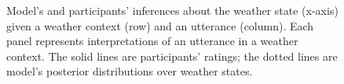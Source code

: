 \documentclass[10pt,letterpaper]{article}
\begin{document}
\begin{figure}[t]
\caption{Model's and participants' inferences about the weather state (x-axis) given a weather context (row) and an utterance (column). Each panel represents interpretations of an utterance in a weather context. The solid lines are participants' ratings; the dotted lines are model's posterior distributions over weather states.}
\label{model-state}
\end{figure}
\end{document}
